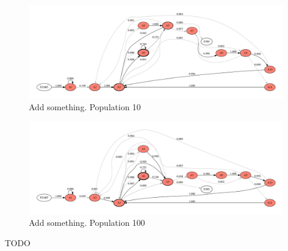 \documentclass{article}
\begin{document}
{%

\begin{figure}[h!]
	\centering
	\includegraphics[width=\textwidth]{../plots/ewan_25_pop_10.pdf}
	\caption{Add something. Population 10}
\end{figure}
\begin{figure}[h!]
	\centering
	\includegraphics[width=\textwidth]{../plots/ewan_25_pop_100.pdf}
	\caption{Add something. Population 100}
\end{figure}
TODO

% 
%
% 
% 

}
\end{document}
